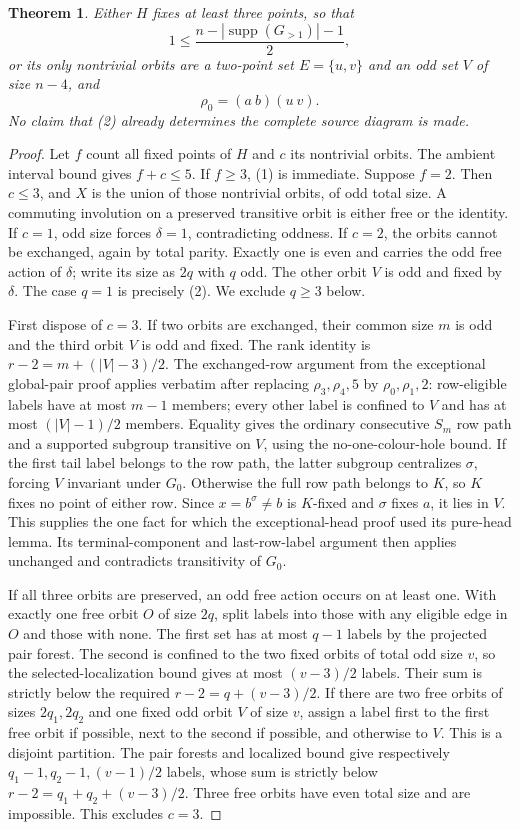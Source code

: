 \documentclass[11pt,a4paper]{article}
\newtheorem{theorem}{Theorem}
\begin{document}
\begin{theorem}
Either $H$ fixes at least three points, so that
\[
 1\le \frac{n-|\operatorname{supp}(G_{>1})|-1}{2},       \tag{1}
\]
or its only nontrivial orbits are a two-point set $E=\{u,v\}$
and an odd set $V$ of size $n-4$, and
\[
               \rho_0=(a\ b)(u\ v).                    \tag{2}
\]
No claim that (2) already determines the complete source diagram is made.
\end{theorem}
\begin{proof}
Let $f$ count all fixed points of $H$ and $c$ its nontrivial orbits.
The ambient interval bound gives $f+c\le5$. If $f\ge3$, (1)
is immediate. Suppose $f=2$. Then $c\le3$, and $X$ is the
union of those nontrivial orbits, of odd total size.
A commuting involution on a preserved transitive orbit is either
free or the identity. If $c=1$, odd size forces $\delta=1$,
contradicting oddness. If $c=2$, the orbits cannot be exchanged,
again by total parity. Exactly one is even and carries the odd free
action of $\delta$; write its size as $2q$ with $q$ odd.
The other orbit $V$ is odd and fixed by $\delta$.
The case $q=1$ is precisely (2). We exclude $q\ge3$ below.

First dispose of $c=3$. If two orbits are exchanged, their common
size $m$ is odd and the third orbit $V$ is odd and fixed. The rank
identity is $r-2=m+(|V|-3)/2$. The exchanged-row argument from the
exceptional global-pair proof applies verbatim after replacing
$\rho_3,\rho_4,5$ by $\rho_0,\rho_1,2$: row-eligible labels have
at most $m-1$ members; every other label is confined to $V$ and
has at most $(|V|-1)/2$ members. Equality gives the ordinary
consecutive $S_m$ row path and a supported subgroup transitive
on $V$, using the no-one-colour-hole bound.
If the first tail label belongs to the row path, the latter subgroup
centralizes $\sigma$, forcing $V$ invariant under $G_0$.
Otherwise the full row path belongs to $K$, so $K$ fixes no point
of either row. Since $x=b^\sigma\ne b$ is $K$-fixed and
$\sigma$ fixes $a$, it lies in $V$. This supplies the one fact
for which the exceptional-head proof used its pure-head lemma.
Its terminal-component and last-row-label argument then applies
unchanged and contradicts transitivity of $G_0$.

If all three orbits are preserved, an odd free action occurs on
at least one. With exactly one free orbit $O$ of size $2q$, split
labels into those with any eligible edge in $O$ and those with none.
The first set has at most $q-1$ labels by the projected pair forest.
The second is confined to the two fixed orbits of total odd size $v$,
so the selected-localization bound gives at most $(v-3)/2$ labels.
Their sum is strictly below the required $r-2=q+(v-3)/2$.
If there are two free orbits of sizes $2q_1,2q_2$ and one fixed
odd orbit $V$ of size $v$, assign a label first to the first free
orbit if possible, next to the second if possible, and otherwise
to $V$. This is a disjoint partition. The pair forests and localized
bound give respectively $q_1-1,q_2-1,(v-1)/2$ labels, whose sum
is strictly below $r-2=q_1+q_2+(v-3)/2$.
Three free orbits have even total size and are impossible.
This excludes $c=3$.


\end{proof}
\end{document}
